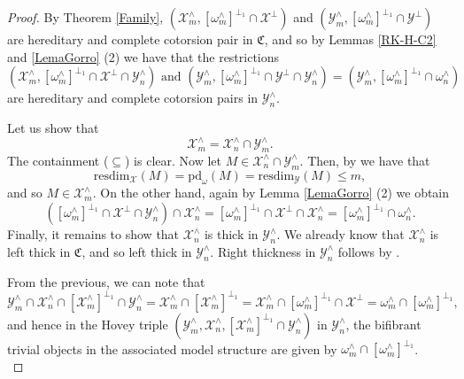 \documentclass[10pt,reqno]{amsart}
\numberwithin{equation}{section}
\theoremstyle{remark}
\newcommand{\C}{\mathfrak{C}}
\newcommand{\X}{\mathcal{X}}
\newcommand{\pd}{\mathrm{pd}}
\newcommand{\resdim}{\mathrm{resdim}}
\begin{document}
\begin{proof}
By Theorem \ref{Family}, $(\X^{\wedge}_m, [\omega^{\wedge}_m]^{\perp_1} \cap \X^\perp)$ and $(\mathcal{Y}^{\wedge}_m, [\omega^{\wedge}_m]^{\perp_1} \cap \mathcal{Y}^\perp)$ are hereditary and complete cotorsion pair in $\C$, and so by Lemmas \ref{RK-H-C2} and \ref{LemaGorro} (2) we have that the restrictions 
\[
(\X^{\wedge}_m, [\omega^{\wedge}_m]^{\perp_1} \cap \X^\perp \cap \mathcal{Y}^\wedge_n) \, \, \text{and} \, \, (\mathcal{Y}^{\wedge}_m, [\omega^{\wedge}_m]^{\perp_1} \cap \mathcal{Y}^\perp \cap \mathcal{Y}^\wedge_n) = (\mathcal{Y}^{\wedge}_m, [\omega^{\wedge}_m]^{\perp_1} \cap \omega^\wedge_n)
\] 
are hereditary and complete cotorsion pairs in $\mathcal{Y}^\wedge_n$. 

Let us show that 
\[
\mathcal{X}^\wedge_m = \mathcal{X}^\wedge_n \cap \mathcal{Y}^\wedge_m.
\]
The containment ($\subseteq$) is clear. Now let $M \in \mathcal{X}^\wedge_n \cap \mathcal{Y}^\wedge_m$. Then, by \cite[Thm. 2.10]{BMSP} we have that 
\[
\resdim_{\X}(M) = \pd_{\omega}(M) = \resdim_{\mathcal{Y}}(M) \leq m,
\]
and so $M \in \mathcal{X}^\wedge_m$. On the other hand, again by Lemma \ref{LemaGorro} (2) we obtain
\[
([\omega^{\wedge}_m]^{\perp_1} \cap \X^\perp \cap \mathcal{Y}^\wedge_n) \cap \mathcal{X}^\wedge_n = [\omega^{\wedge}_m]^{\perp_1} \cap \X^\perp \cap \mathcal{X}^\wedge_n = [\omega^{\wedge}_m]^{\perp_1} \cap \omega^\wedge_n.
\]
Finally, it remains to show that $\mathcal{X}^\wedge_n$ is thick in $\mathcal{Y}^\wedge_n$. We already know that $\mathcal{X}^\wedge_n$ is left thick in $\C$, and so left thick in $\mathcal{Y}^\wedge_n$. Right thickness in $\mathcal{Y}^\wedge_n$ follows by \cite[Thms. 2.10 \& 2.11]{BMSP}. 

From the previous, we can note that 
\[
\mathcal{Y}^\wedge_m \cap \mathcal{X}^\wedge_n \cap [\mathcal{X}^\wedge_m]^{\perp_1} \cap \mathcal{Y}^\wedge_n = \mathcal{X}^\wedge_m \cap [\mathcal{X}^\wedge_m]^{\perp_1} = \mathcal{X}^\wedge_m \cap [\omega^{\wedge}_m]^{\perp_1} \cap \X^\perp = \omega^{\wedge}_m \cap [\omega^{\wedge}_m]^{\perp_1},
\]
and hence in the Hovey triple $(\mathcal{Y}^\wedge_m, \mathcal{X}^\wedge_n, [\mathcal{X}^\wedge_m]^{\perp_1} \cap \mathcal{Y}^\wedge_n)$ in $\mathcal{Y}^\wedge_n$, the bifibrant trivial objects in the associated model structure are given by $\omega^{\wedge}_m \cap [\omega^{\wedge}_m]^{\perp_1}$. \\
\end{proof}
\end{document}
